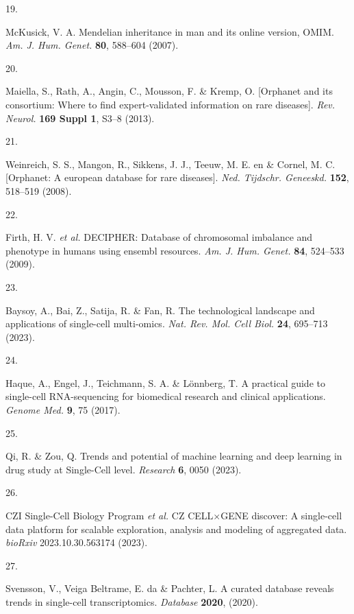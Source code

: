 \documentclass[
]{article}
\newlength{\cslhangindent}
\newlength{\csllabelwidth}
\newenvironment{CSLReferences}[2] %
 {\begin{list}{}{%
  \setlength{\itemindent}{0pt}
  \setlength{\leftmargin}{0pt}
  \setlength{\parsep}{0pt}
  \ifodd #1
   \setlength{\leftmargin}{\cslhangindent}
   \setlength{\itemindent}{-1\cslhangindent}
  \fi
  \setlength{\itemsep}{#2\baselineskip}}}
 {\end{list}}
\newcommand{\CSLLeftMargin}[1]{\parbox[t]{\csllabelwidth}{\strut#1\strut}}
\newcommand{\CSLRightInline}[1]{\parbox[t]{\linewidth - \csllabelwidth}{\strut#1\strut}}
\begin{document}
\begin{CSLReferences}{0}{0}
\CSLLeftMargin{19. }%
\CSLRightInline{McKusick, V. A. Mendelian inheritance in man and its
online version, {OMIM}. \emph{Am. J. Hum. Genet.} \textbf{80}, 588--604
(2007).}

\CSLLeftMargin{20. }%
\CSLRightInline{Maiella, S., Rath, A., Angin, C., Mousson, F. \& Kremp,
O. {[}Orphanet and its consortium: Where to find expert-validated
information on rare diseases{]}. \emph{Rev. Neurol.} \textbf{169 Suppl
1}, S3--8 (2013).}

\CSLLeftMargin{21. }%
\CSLRightInline{Weinreich, S. S., Mangon, R., Sikkens, J. J., Teeuw, M.
E. en \& Cornel, M. C. {[}Orphanet: A european database for rare
diseases{]}. \emph{Ned. Tijdschr. Geneeskd.} \textbf{152}, 518--519
(2008).}

\CSLLeftMargin{22. }%
\CSLRightInline{Firth, H. V. \emph{et al.} {DECIPHER}: Database of
chromosomal imbalance and phenotype in humans using ensembl resources.
\emph{Am. J. Hum. Genet.} \textbf{84}, 524--533 (2009).}

\CSLLeftMargin{23. }%
\CSLRightInline{Baysoy, A., Bai, Z., Satija, R. \& Fan, R. The
technological landscape and applications of single-cell multi-omics.
\emph{Nat. Rev. Mol. Cell Biol.} \textbf{24}, 695--713 (2023).}

\CSLLeftMargin{24. }%
\CSLRightInline{Haque, A., Engel, J., Teichmann, S. A. \& Lönnberg, T. A
practical guide to single-cell {RNA-sequencing} for biomedical research
and clinical applications. \emph{Genome Med.} \textbf{9}, 75 (2017).}

\CSLLeftMargin{25. }%
\CSLRightInline{Qi, R. \& Zou, Q. Trends and potential of machine
learning and deep learning in drug study at {Single-Cell} level.
\emph{Research} \textbf{6}, 0050 (2023).}

\CSLLeftMargin{26. }%
\CSLRightInline{CZI Single-Cell Biology Program \emph{et al.} {CZ}
{CELL\(\times\)GENE} discover: A single-cell data platform for scalable
exploration, analysis and modeling of aggregated data. \emph{bioRxiv}
2023.10.30.563174 (2023).}

\CSLLeftMargin{27. }%
\CSLRightInline{Svensson, V., Veiga Beltrame, E. da \& Pachter, L. A
curated database reveals trends in single-cell transcriptomics.
\emph{Database} \textbf{2020}, (2020).}


\end{CSLReferences}
\end{document}
